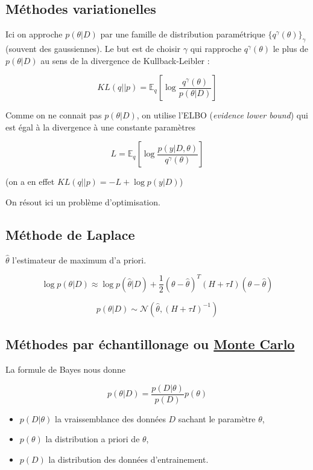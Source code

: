 \documentclass[french,12pt]{article}
\begin{document}
\subsection{Méthodes variationelles}

Ici on approche $p(\theta | D)$ par une famille de distribution
paramétrique $\{q^{\gamma}(\theta)\}_{\gamma}$ (souvent des gaussiennes).
Le but est de choisir $\gamma$ qui rapproche $q^{\gamma}(\theta)$
le plus de $p(\theta | D)$ au sens de la divergence de Kullback-Leibler :

$$KL(q||p) = \mathbb{E}_q \left[\log \frac{q^{\gamma}(\theta)}{p(\theta | D)}\right]$$

Comme on ne connait pas $p(\theta | D)$, on utilise l'ELBO (\textit{evidence lower bound})
qui est égal à la divergence à une constante paramètres

$$L =\mathbb{E}_q \left[\log \frac{p(y | D, \theta)}{q^{\gamma}(\theta)}\right]$$

(on a en effet $KL(q||p) = -L +  \log p(y| D)$)

On résout ici un problème d'optimisation.

\subsection{Méthode de Laplace}

$\hat{\theta}$ l'estimateur de maximum d'a priori.

$$\log p(\theta | D) \approx \log p(\hat{\theta} | D)
    + \frac{1}{2} (\theta - \hat{\theta})^T (H + \tau I)
    (\theta - \hat{\theta})$$

$$p(\theta | D) \sim \mathcal{N}(\hat{\theta}, (H + \tau I)^{-1})$$

\subsection{Méthodes par échantillonage ou \href{https://en.wikipedia.org/wiki/Monte_Carlo_method}{Monte Carlo}}

La formule de Bayes nous donne

$$p(\theta | D) = \frac{p(D | \theta) }{p(D)}p(\theta)$$

\begin{itemize}
    \item $p(D | \theta)$ la vraissemblance des données $D$ sachant le paramètre $\theta$,
    \item $p(\theta)$ la distribution a priori de $\theta$,
    \item $p(D)$ la distribution des données d'entrainement.
\end{itemize}
\end{document}
